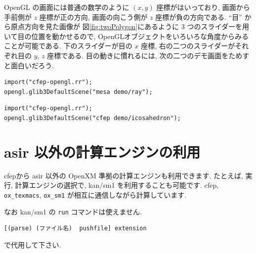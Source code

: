 \documentclass{jbook}
\begin{document}
OpenGL の画面には普通の数学のように $(x,y)$ 座標がはいっており,
画面から手前側が $z$ 座標が正の方向, 画面の向こう側が
$z$ 座標が負の方向である. 
``目'' から原点方向を見た画像が
図\ref{fig:twoPolygon}にあるように 3 つのスライダーを用いて目の位置を動かせるので,
OpenGLオブジェクトをいろいろな角度からみることが可能である.
下のスライダーが目の $x$ 座標, 右の二つのスライダーがそれぞれ目の $y$, $z$ 座標である.
目の動きに慣れるには, 次の二つのデモ画面をためすと面白いだろう.
\begin{screen}
\begin{verbatim}
import("cfep-opengl.rr");
opengl.glib3DefaultScene("mesa demo/ray");
\end{verbatim}
\end{screen}

\begin{screen}
\begin{verbatim}
import("cfep-opengl.rr");
opengl.glib3DefaultScene("cfep demo/icosahedron");
\end{verbatim}
\end{screen}

\section{asir 以外の計算エンジンの利用}

cfepから asir 以外の OpenXM 準拠の計算エンジンも利用できます.
たとえば, 実行, 計算エンジンの選択で, kan/sm1 を利用することも可能です.
cfep, {\tt ox\_texmacs}, {\tt ox\_sm1} が相互に通信しながら計算しています.

なお kan/sm1 の {\tt run} コマンドは使えません.
\begin{verbatim}
[(parse) (ファイル名)  pushfile] extension 
\end{verbatim}
で代用して下さい.

\cleardoublepage
\flushbottom
\printindex
\end{document}
